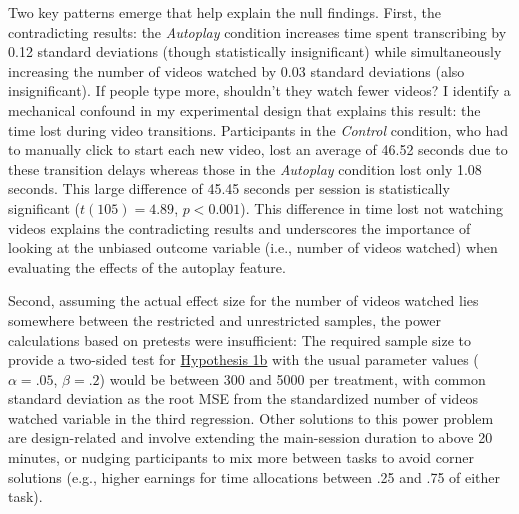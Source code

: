 \documentclass[11pt,a4paper,oneside]{article}
\begin{document}
Two key patterns emerge that help explain the null findings. First, the contradicting results: the \textit{Autoplay} condition increases time spent transcribing by 0.12 standard deviations (though statistically insignificant) while simultaneously increasing the number of videos watched by 0.03 standard deviations (also insignificant). If people type more, shouldn't they watch fewer videos? I identify a mechanical confound in my experimental design that explains this result: the time lost during video transitions. Participants in the \textit{Control} condition, who had to manually click to start each new video, lost an average of 46.52 seconds due to these transition delays whereas those in the \textit{Autoplay} condition lost only 1.08 seconds. This large difference of 45.45 seconds per session is statistically significant ($t(105) = 4.89$, $p < 0.001$). This difference in time lost not watching videos explains the contradicting results and underscores the importance of looking at the unbiased outcome variable (i.e., number of videos watched) when evaluating the effects of the autoplay feature.

Second, assuming the actual effect size for the number of videos watched lies somewhere between the restricted and unrestricted samples, the power calculations based on pretests were insufficient: The required sample size to provide a two-sided test for \hyperref[hypotheses]{Hypothesis 1b} with the usual parameter values ($\alpha = .05$, $\beta = .2$) would be between 300 and 5000 per treatment, with common standard deviation as the root MSE from the standardized number of videos watched variable in the third regression. Other solutions to this power problem are design-related and involve extending the main-session duration to above 20 minutes, or nudging participants to mix more between tasks to avoid corner solutions (e.g., higher earnings for time allocations between .25 and .75 of either task).
\end{document}
